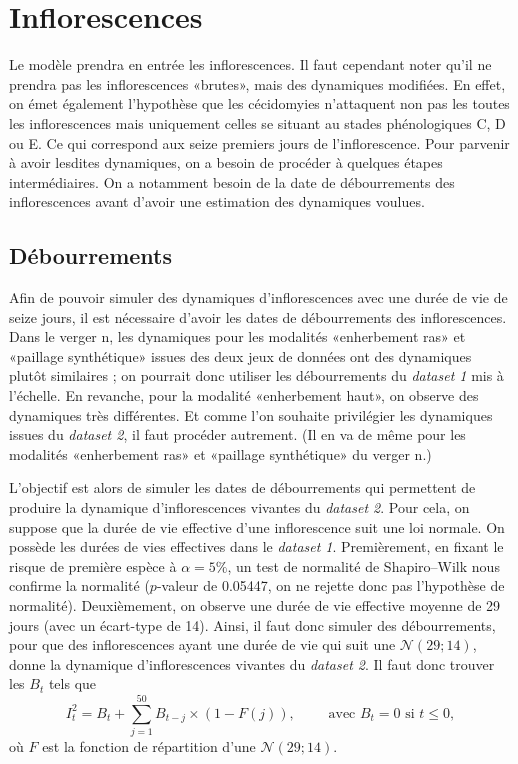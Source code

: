 \clearpage

\section{Inflorescences}

Le modèle prendra en entrée les inflorescences.
Il faut cependant noter qu'il ne prendra pas les inflorescences «brutes», mais des dynamiques modifiées.
En effet, on émet également l'hypothèse que les cécidomyies n'attaquent non pas les toutes les inflorescences mais uniquement celles se situant au stades phénologiques C, D ou E.
Ce qui correspond aux seize premiers jours de l'inflorescence.
Pour parvenir à avoir lesdites dynamiques, on a besoin de procéder à quelques étapes intermédiaires.
On a notamment besoin de la date de débourrements des inflorescences avant d'avoir une estimation des dynamiques voulues.

\subsection{Débourrements}

 Afin de pouvoir simuler des dynamiques d'inflorescences avec une durée de vie de seize jours, il est nécessaire d'avoir les dates de débourrements des inflorescences.
 Dans le verger n, les dynamiques pour les modalités «enherbement ras» et «paillage synthétique» issues des deux jeux de données ont des dynamiques plutôt similaires ; on pourrait donc utiliser les débourrements du \emph{dataset 1} mis à l'échelle.
 En revanche, pour la modalité «enherbement haut», on observe des dynamiques très différentes. 
 Et comme l'on souhaite privilégier les dynamiques issues du \emph{dataset 2}, il faut procéder autrement.
 (Il en va de même pour les modalités «enherbement ras» et «paillage synthétique» du verger n.)
 
 L'objectif est alors de simuler les dates de débourrements qui permettent de produire la dynamique d'inflorescences vivantes du \emph{dataset 2}.
 Pour cela, on suppose que la durée de vie effective d'une inflorescence suit une loi normale.
 On possède les durées de vies effectives dans le \emph{dataset 1}.
 Premièrement, en fixant le risque de première espèce à $\alpha = 5\%$, un test de normalité de Shapiro--Wilk nous confirme la normalité ($p$-valeur de 0.05447, on ne rejette donc pas l'hypothèse de normalité).
 Deuxièmement, on observe une durée de vie effective moyenne de 29 jours (avec un écart-type de 14).
 Ainsi, il faut donc simuler des débourrements, pour que des inflorescences ayant une durée de vie qui suit une $\mathcal{N}\left( 29; 14 \right)$, donne la dynamique d'inflorescences vivantes du \emph{dataset 2}.
 Il faut donc trouver les $B_t$ tels que 
 \[
 I_{t}^{2} = B_t + \sum_{j = 1}^{50} B_{t - j} \times \left( 1 - F\left( j \right) \right),  \qquad \text{ avec } B_{t} = 0 \text{ si } t \leq 0,
 \]
 où $F$ est la fonction de répartition d'une $\mathcal{N}\left( 29;14 \right)$.
 
